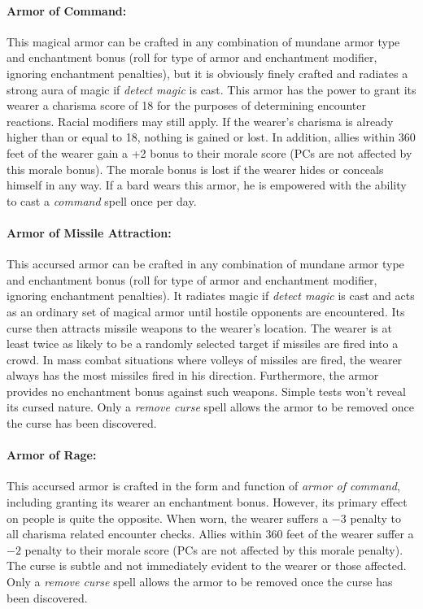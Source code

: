 \begin{multicols}{2}
\paragraph{Armor of Command:} This magical armor can be crafted in any combination of mundane armor type and enchantment bonus (roll for type of armor and enchantment modifier, ignoring enchantment penalties), but it is obviously finely crafted and radiates a strong aura of magic if \textit{detect magic} is cast.  This armor has the power to grant its wearer a charisma score of 18 for the purposes of determining encounter reactions.  Racial modifiers may still apply.  If the wearer's charisma is already higher than or equal to 18, nothing is gained or lost.  In addition, allies within 360 feet of the wearer gain a +2 bonus to their morale score (PCs are not affected by this morale bonus).  The morale bonus is lost if the wearer hides or conceals himself in any way.  If a bard wears this armor, he is empowered with the ability to cast a \textit{command} spell once per day.  

\paragraph{Armor of Missile Attraction:} This accursed armor can be crafted in any combination of mundane armor type and enchantment bonus (roll for type of armor and enchantment modifier, ignoring enchantment penalties).  It radiates magic if \textit{detect magic} is cast and acts as an ordinary set of magical armor until hostile opponents are encountered.  Its curse then attracts missile weapons to the wearer's location.  The wearer is at least twice as likely to be a randomly selected target if missiles are fired into a crowd.  In mass combat situations where volleys of missiles are fired, the wearer always has the most missiles fired in his direction. Furthermore, the armor provides no enchantment bonus against such weapons.  Simple tests won't reveal its cursed nature.  Only a \textit{remove curse} spell allows the armor to be removed once the curse has been discovered.

\paragraph{Armor of Rage:} This accursed armor is crafted in the form and function of \textit{armor of command}, including granting its wearer an enchantment bonus.  However, its primary effect on people is quite the opposite.  When worn, the wearer suffers a $-3$ penalty to all charisma related encounter checks.  Allies within 360 feet of the wearer suffer a $-2$ penalty to their morale score (PCs are not affected by this morale penalty).  The curse is subtle and not immediately evident to the wearer or those affected.  Only a \textit{remove curse} spell allows the armor to be removed once the curse has been discovered.


\end{multicols}
